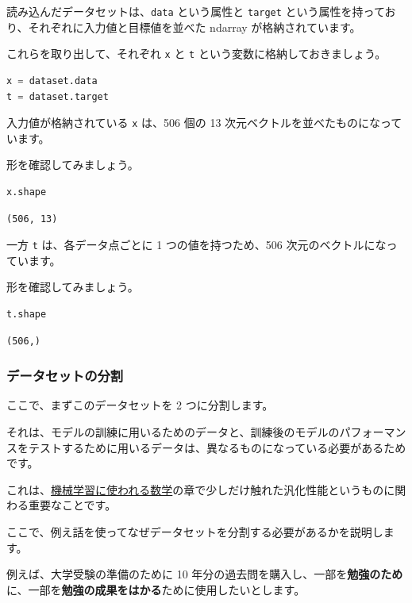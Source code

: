読み込んだデータセットは、\texttt{data} という属性と \texttt{target} という属性を持っており、それぞれに入力値と目標値を並べた ndarray が格納されています。

これらを取り出して、それぞれ \texttt{x} と \texttt{t} という変数に格納しておきましょう。


\begin{lstlisting}[style=codecell,language=Python]
x = dataset.data
t = dataset.target
\end{lstlisting}

入力値が格納されている \texttt{x} は、506 個の 13 次元ベクトルを並べたものになっています。

形を確認してみましょう。


\begin{lstlisting}[style=codecell,language=Python]
x.shape
\end{lstlisting}

\begin{lstlisting}[style=outputcell]
(506, 13)
\end{lstlisting}

一方 \texttt{t} は、各データ点ごとに 1 つの値を持つため、506 次元のベクトルになっています。

形を確認してみましょう。


\begin{lstlisting}[style=codecell,language=Python]
t.shape
\end{lstlisting}

\begin{lstlisting}[style=outputcell]
(506,)
\end{lstlisting}

\subsubsection{データセットの分割}


ここで、まずこのデータセットを 2 つに分割します。

それは、モデルの訓練に用いるためのデータと、訓練後のモデルのパフォーマンスをテストするために用いるデータは、異なるものになっている必要があるためです。

これは、\href{https://tutorials.chainer.org/ja/03_Basic_Math_for_Machine_Learning.html}{機械学習に使われる数学}の章で少しだけ触れた汎化性能というものに関わる重要なことです。


ここで、例え話を使ってなぜデータセットを分割する必要があるかを説明します。

例えば、大学受験の準備のために 10 年分の過去問を購入し、一部を\textbf{勉強のため}に、一部を\textbf{勉強の成果をはかる}ために使用したいとします。

